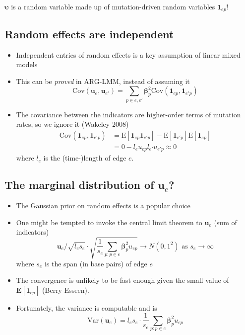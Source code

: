 \documentclass[
  letterpaper,
  DIV=11,
  numbers=noendperiod]{scrartcl}
\begin{document}
\(\boldsymbol{\upsilon}\) is a random variable made up of
mutation-driven random variables \(\mathbf{1}_{ep}\)!

\subsection{Random effects are
independent}\label{random-effects-are-independent}

\begin{itemize}
\item
  Independent entries of random effects is a key assumption of linear
  mixed models
\item
  This can be \emph{proved} in ARG-LMM, instead of assuming it \[
    \mathrm{Cov}( \mathbf{u}_e, \mathbf{u}_{e'} ) = \sum_{p \in e,e'} \boldsymbol{\beta}_p^2 \mathrm{Cov}(\mathbf{1}_{ep}, \mathbf{1}_{e'p})
  \]
\item
  The covariance between the indicators are higher-order terms of
  mutation rates, so we ignore it (Wakeley 2008) \[
    \begin{aligned}
    \mathrm{Cov}(\mathbf{1}_{ep}, \mathbf{1}_{e'p}) &= \mathrm{E}[\mathbf{1}_{ep}\mathbf{1}_{e'p}] - \mathrm{E}[\mathbf{1}_{e'p}]\mathrm{E}[\mathbf{1}_{ep}] \\
        &= 0 -l_eu_{ep}l_{e'}u_{e'p} \approx 0
    \end{aligned}
  \] where \(l_e\) is the (time-)length of edge \(e\).
\end{itemize}

\subsection{\texorpdfstring{The marginal distribution of
\(\mathbf{u}_e\)?}{The marginal distribution of \textbackslash mathbf\{u\}\_e?}}\label{the-marginal-distribution-of-mathbfu_e}

\begin{itemize}
\item
  The Gaussian prior on random effects is a popular choice
\item
  One might be tempted to invoke the central limit theorem to
  \(\mathbf{u}_e\) (sum of indicators) \[
        \mathbf{u}_e \bigg/ \sqrt{l_e s_e} \cdot \sqrt{ \frac{1}{s_e} \sum_{p:p \in e} \boldsymbol{\beta}_p^2 u_{ep} } 
        \rightarrow N(0,1^2) \text{ as } s_e \rightarrow \infty
    \] where \(s_e\) is the span (in base pairs) of edge \(e\)
\item
  The convergence is unlikely to be fast enough given the small value of
  \(\mathbf{E}[\mathbf{1}_{ep}]\) (Berry-Esseen).
\item
  Fortunately, the variance is computable and is \[
        \mathrm{Var}(\mathbf{u}_e) = l_e s_e \cdot \frac{1}{s_e} \sum_{p:p \in e} \boldsymbol{\beta}_p^2 u_{ep}
    \]
\end{itemize}
\end{document}
